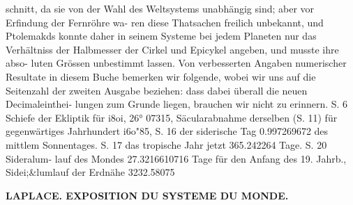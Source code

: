 \documentclass[12pt,a4paper]{article}
\begin{document}
schnitt, da  sie  von  der  Wahl  des  Weltsystems  unabhängig  sind;  aber  vor  Erfindung  der  Fernröhre  wa- ren diese  Thatsachen  freilich  unbekannt,  und  Ptolemakds  konnte  daher  in  seinem  Systeme  bei  jedem Planeten  nur  das  Verhältniss  der  Halbmesser  der  Cirkel  und  Epicykel  angeben,  und  musste  ihre  abso- luten Grössen  unbestimmt  lassen. Von  verbesserten  Angaben  numerischer  Resultate  in  diesem  Buche  bemerken  wir  folgende,  wobei wir  uns  auf  die  Seitenzahl  der  zweiten  Ausgabe  beziehen:  dass  dabei  überall  die  neuen  Decimaleinthei- lungen  zum  Grunde  liegen,  brauchen  wir  nicht  zu  erinnern.  S.  6  Schiefe  der  Ekliptik  für  i8oi,  26°  07315, Säcularabnahme  derselben  (S.  11)  für  gegenwärtiges  Jahrhundert  i6o"85,  S.  16  der  siderische  Tag 0.997269672  des  mittlem  Sonnentages.  S.  17  das  tropische  Jahr  jetzt  365.242264  Tage.  S.  20  Sideralum- lauf  des  Mondes  27.3216610716  Tage  für  den  Anfang  des  19.  Jahrb.,  Sidei;\&lumlauf  der  Erdnähe  3232.58075

\vspace{0.5em}


\noindent\textbf{LAPLACE.     EXPOSITION  DU  SYSTEME  DU  MONDE.}
\end{document}
